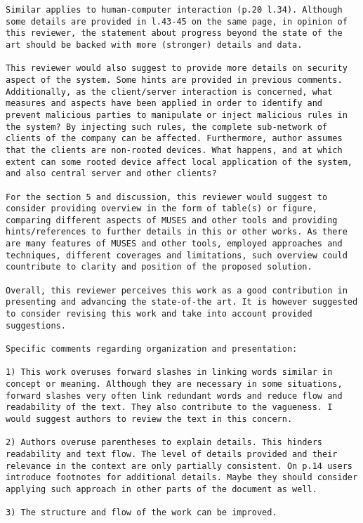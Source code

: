 \documentclass[preprint]{elsarticle}
\begin{document}
\begin{verbatim}
Similar applies to human-computer interaction (p.20 l.34). Although some details are provided in l.43-45 on the same page, in opinion of this reviewer, the statement about progress beyond the state of the art should be backed with more (stronger) details and data.

This reviewer would also suggest to provide more details on security aspect of the system. Some hints are provided in previous comments. Additionally, as the client/server interaction is concerned, what measures and aspects have been applied in order to identify and prevent malicious parties to manipulate or inject malicious rules in the system? By injecting such rules, the complete sub-network of clients of the company can be affected. Furthermore, author assumes that the clients are non-rooted devices. What happens, and at which extent can some rooted device affect local application of the system, and also central server and other clients?

For the section 5 and discussion, this reviewer would suggest to consider providing overview in the form of table(s) or figure, comparing different aspects of MUSES and other tools and providing hints/references to further details in this or other works. As there are many features of MUSES and other tools, employed approaches and techniques, different coverages and limitations, such overview could countribute to clarity and position of the proposed solution.

Overall, this reviewer perceives this work as a good contribution in presenting and advancing the state-of-the art. It is however suggested to consider revising this work and take into account provided suggestions.

Specific comments regarding organization and presentation:

1) This work overuses forward slashes in linking words similar in concept or meaning. Although they are necessary in some situations, forward slashes very often link redundant words and reduce flow and readability of the text. They also contribute to the vagueness. I would suggest authors to review the text in this concern.

2) Authors overuse parentheses to explain details. This hinders readability and text flow. The level of details provided and their relevance in the context are only partially consistent. On p.14 users introduce footnotes for additional details. Maybe they should consider applying such approach in other parts of the document as well.

3) The structure and flow of the work can be improved.
\end{verbatim}
\end{document}
